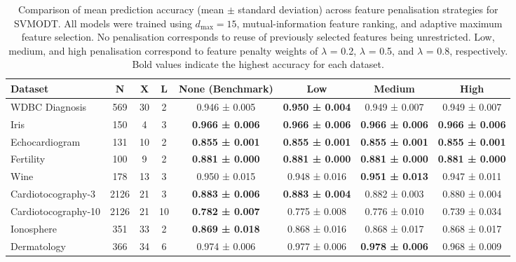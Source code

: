 \begin{table}
\centering
\caption{\label{tab:svmodt-features-penalty-score-table-latex}Comparison of mean prediction accuracy (mean \(\pm\) standard deviation) across feature penalisation strategies for SVMODT. All models were trained using \(d_{\max}=15\), mutual-information feature ranking, and adaptive maximum feature selection. No penalisation corresponds to reuse of previously selected features being unrestricted. Low, medium, and high penalisation correspond to feature penalty weights of \(\lambda\) = 0.2, \(\lambda\) = 0.5, and \(\lambda\) = 0.8, respectively. Bold values indicate the highest accuracy for each dataset.}
\centering
\fontsize{8}{10}\selectfont
\begin{tabular}[t]{l|c|c|c|c|c|c|c}
\hline
Dataset & N & X & L & None (Benchmark) & Low & Medium & High\\
\hline
WDBC Diagnosis & 569 & 30 & 2 & 0.946 ± 0.005 & \textbf{0.950 ± 0.004} & 0.949 ± 0.007 & 0.949 ± 0.007\\
\hline
Iris & 150 & 4 & 3 & \textbf{0.966 ± 0.006} & \textbf{0.966 ± 0.006} & \textbf{0.966 ± 0.006} & \textbf{0.966 ± 0.006}\\
\hline
Echocardiogram & 131 & 10 & 2 & \textbf{0.855 ± 0.001} & \textbf{0.855 ± 0.001} & \textbf{0.855 ± 0.001} & \textbf{0.855 ± 0.001}\\
\hline
Fertility & 100 & 9 & 2 & \textbf{0.881 ± 0.000} & \textbf{0.881 ± 0.000} & \textbf{0.881 ± 0.000} & \textbf{0.881 ± 0.000}\\
\hline
Wine & 178 & 13 & 3 & 0.950 ± 0.015 & 0.948 ± 0.016 & \textbf{0.951 ± 0.013} & 0.947 ± 0.011\\
\hline
Cardiotocography-3 & 2126 & 21 & 3 & \textbf{0.883 ± 0.006} & \textbf{0.883 ± 0.004} & 0.882 ± 0.003 & 0.880 ± 0.004\\
\hline
Cardiotocography-10 & 2126 & 21 & 10 & \textbf{0.782 ± 0.007} & 0.775 ± 0.008 & 0.776 ± 0.010 & 0.739 ± 0.034\\
\hline
Ionosphere & 351 & 33 & 2 & \textbf{0.869 ± 0.018} & 0.868 ± 0.016 & 0.868 ± 0.017 & 0.868 ± 0.017\\
\hline
Dermatology & 366 & 34 & 6 & 0.974 ± 0.006 & 0.977 ± 0.006 & \textbf{0.978 ± 0.006} & 0.968 ± 0.009\\
\hline
\end{tabular}
\end{table}

